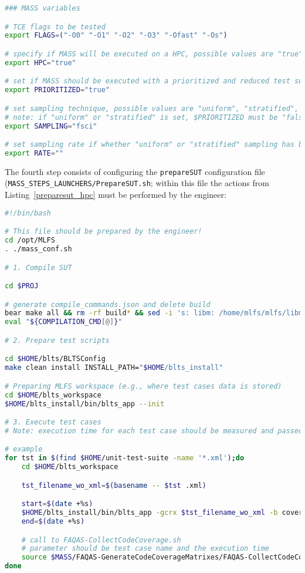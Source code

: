 \begin{lstlisting}[language=bash, label=mutation_additional_hpc_mass ,caption=\MASS specific variables. Excerpt of mass\_conf.sh file.]
### MASS variables

# TCE flags to be tested
export FLAGS=("-O0" "-O1" "-O2" "-O3" "-Ofast" "-Os")

# specify if MASS will be executed on a HPC, possible values are "true" or "false"
export HPC="true"

# set if MASS should be executed with a prioritized and reduced test suite
export PRIORITIZED="true"

# set sampling technique, possible values are "uniform", "stratified", "fsci", and "no"
# note: if "uniform" or "stratified" is set, $PRIORITIZED must be "false"
export SAMPLING="fsci"

# set sampling rate if whether "uniform" or "stratified" sampling has been selected
export RATE=""
\end{lstlisting}

The fourth step consists of configuring the \texttt{prepareSUT} configuration file \\(\texttt{MASS\_STEPS\_LAUNCHERS/PrepareSUT.sh}; within this file the actions from Listing~\ref{preparesut_hpc} must be performed by the engineer:

\begin{lstlisting}[language=bash, label=preparesut_hpc ,caption=\MASS PrepareSUT.sh file.]
#!/bin/bash

# This file should be prepared by the engineer!
cd /opt/MLFS
. ./mass_conf.sh

# 1. Compile SUT

cd $PROJ

# generate compile_commands.json and delete build
bear make all && rm -rf build* && sed -i 's: libm: /home/mlfs/mlfs/libm:' compile_commands.json && mv compile_commands.json $MUTANTS_DIR
eval "${COMPILATION_CMD[@]}"

# 2. Prepare test scripts

cd $HOME/blts/BLTSConfig
make clean install INSTALL_PATH="$HOME/blts_install"

# Preparing MLFS workspace (e.g., where test cases data is stored)
cd $HOME/blts_workspace
$HOME/blts_install/bin/blts_app --init

# 3. Execute test cases
# Note: execution time for each test case should be measured and passed as argument to FAQAS-CollectCodeCoverage.sh

# example
for tst in $(find $HOME/unit-test-suite -name '*.xml');do
    cd $HOME/blts_workspace

    tst_filename_wo_xml=$(basename -- $tst .xml)

    start=$(date +%s)
    $HOME/blts_install/bin/blts_app -gcrx $tst_filename_wo_xml -b coverage --nocsv -s $tst
    end=$(date +%s)

    # call to FAQAS-CollectCodeCoverage.sh
    # parameter should be test case name and the execution time
    source $MASS/FAQAS-GenerateCodeCoverageMatrixes/FAQAS-CollectCodeCoverage.sh $tst_filename_wo_xml "$(($end-$start))"
done
\end{lstlisting}

